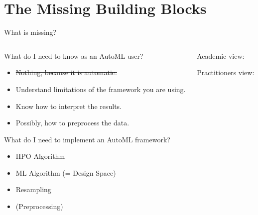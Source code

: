 \section{The Missing Building Blocks}

\begin{frame}{What is missing?}
  \begin{columns}
    \begin{column}{0.5\textwidth}
        What do I need to know as an AutoML user?
        \begin{itemize}
          \item \sout{Nothing, because it is automatic.}
          \item Understand limitations of the framework you are using.
          \item Know how to interpret the results.
          \item Possibly, how to preprocess the data.
        \end{itemize}

        \vspace{1em}

        What do I need to implement an AutoML framework?
        \begin{itemize}
          \item HPO Algorithm
          \item ML Algorithm (= Design Space)
          \item Resampling
          \item (Preprocessing)
        \end{itemize}
    \end{column}%
    \begin{column}{0.5\textwidth}
      \begin{center}
        Academic view:
        \scalebox{0.45}{
          
        }

        \vspace{1em}

        Practitioners view:
        \scalebox{0.45}{
          
        }
      \end{center}
    \end{column}
  \end{columns}
\end{frame}

